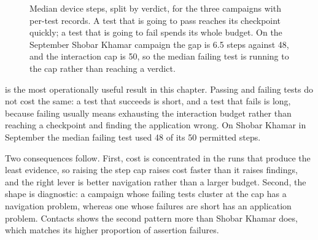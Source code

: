 \begin{figure}[htbp]
  \centering
  \caption[Median device steps by verdict]{Median device steps, split by
  verdict, for the three campaigns with per-test records. A test that is going
  to pass reaches its checkpoint quickly; a test that is going to fail spends
  its whole budget. On the September Shobar Khamar campaign the gap is 6.5 steps
  against 48, and the interaction cap is 50, so the median failing test is
  running to the cap rather than reaching a verdict.}
  \label{fig:stepsverdict}
\end{figure}

 is the most operationally useful result in this
chapter. Passing and failing tests do not cost the same: a test that succeeds
is short, and a test that fails is long, because failing usually means
exhausting the interaction budget rather than reaching a checkpoint and finding
the application wrong. On Shobar Khamar in September the median failing test used 48 of
its 50 permitted steps.

Two consequences follow. First, cost is concentrated in the runs that produce
the least evidence, so raising the step cap raises cost faster than it raises
findings, and the right lever is better navigation rather than a larger budget.
Second, the shape is diagnostic: a campaign whose failing tests cluster at the
cap has a navigation problem, whereas one whose failures are short has an
application problem. Contacts shows the second pattern more than Shobar Khamar does,
which matches its higher proportion of assertion failures.


